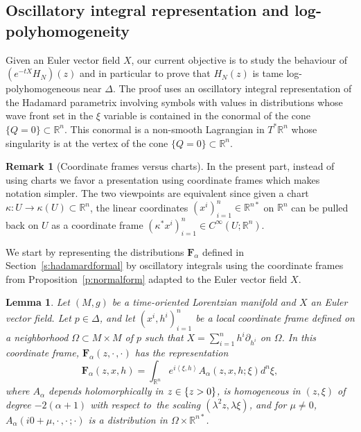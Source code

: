 \documentclass[JEP,XML,SOM,Unicode]{cedram}
\newtheorem{lemma}[theorem]{Lemma}
\theoremstyle{definition}
\newtheorem{remark}[theorem]{Remark}
\let\cv\alpha
\let\euler X
\let\Im\relax
\DeclareMathOperator{\Im}{Im}
\renewcommand{\sec}[1]{Section~\ref{#1}}
\begin{document}
\subsection{Oscillatory integral representation and log-polyhomogeneity}\label{ss:polhom} Given an Euler vector field $\euler$, our current objective is to study the behaviour
of $\left(e^{-t\euler}H_N\right)(z)$ and in particular to prove that
$H_N(z)$ is tame log-polyhomogeneous near $\Delta$. The proof uses an
oscillatory integral representation of the Hadamard parametrix involving
symbols with values in distributions whose wave front set in the $\xi$ variable is contained in the conormal of the cone $\{Q=0\}\subset \mathbb{R}^n$. This conormal is a non-smooth Lagrangian in $T^*\mathbb{R}^n$ whose singularity is at the vertex of the cone $\{Q=0\}\subset \mathbb{R}^n$.

\begin{remark}[Coordinate frames versus charts]
In the present part, instead of using charts we
favor a presentation using coordinate frames
which makes notation
simpler. The two viewpoints are equivalent
since given a chart $\kappa:U\to \kappa(U)\subset \mathbb{R}^n$, the linear
coordinates $(x^i)_{i=1}^n \in \mathbb{R}^{n*}$ on $\mathbb{R}^n$ can be pulled back on
$U$ as a coordinate frame $(\kappa^*x^i)_{i=1}^n\in C^\infty(U;\mathbb{R}^n)$.
\end{remark}

We start by representing the distributions $\mathbf{F}_\cv$ defined in \sec{s:hadamardformal} by oscillatory integrals using the
coordinate frames from Proposition~\ref{p:normalform} adapted to
the Euler vector field $\euler$.

\begin{lemma}\label{l:kuranishi}
Let $(M,g)$ be a time-oriented Lorentzian manifold and $\euler$ an Euler vector field. Let $p\in \Delta$, and let $(x^i,h^i)_{i=1}^n$ be a local coordinate frame defined on a neighborhood $\Omega\subset M\times M$ of $p$ such that $\euler=\sum_{i=1}^n h^i\partial_{h^i}$ on $\Omega$.
In this coordinate frame, $\mathbf{F}_\cv(z,\cdot\,,\cdot)$ has the representation
\[
\mathbf{F}_\cv(z,x,h)=\int_{\mathbb{R}^n} e^{i\left\langle\xi,h\right\rangle} A_\cv(z,x,h;\xi) d^n\xi,
\]
where $A_\cv$ depends holomorphically in $z\in \{\Im z>0\}$, is homogeneous in $(z,\xi)$ of degree $-2(\cv+1)$
with respect to~the scaling
$(\lambda^2z,\lambda\xi) $, and for $\mu\neq 0$, $A_\cv(i0+\mu,\cdot\,,\cdot\,;\cdot)$ is a {distribution} in $\Omega\times \mathbb{R}^{n*}$.
\end{lemma}
\end{document}
